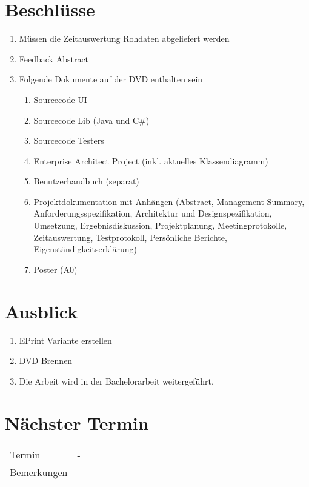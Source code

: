 \documentclass[11pt, a4paper,oneside]{scrartcl}
\begin{document}
	\section{Beschlüsse}
	\begin{enumerate}
		\item Müssen die Zeitauswertung Rohdaten abgeliefert werden
		\item Feedback Abstract
		\item Folgende Dokumente auf der DVD enthalten sein
		\begin{enumerate}
			\item Sourcecode UI
			\item Sourcecode Lib (Java und C\#)
			\item Sourcecode Testers
			\item Enterprise Architect Project (inkl. aktuelles Klassendiagramm)
			\item Benutzerhandbuch (separat)
			\item Projektdokumentation mit Anhängen (Abstract, Management Summary, Anforderungsspezifikation, Architektur und Designspezifikation, Umsetzung, Ergebnisdiskussion, Projektplanung, Meetingprotokolle, Zeitauswertung, Testprotokoll, Persönliche Berichte, Eigenständigkeitserklärung)
			\item Poster (A0)
		\end{enumerate}
	\end{enumerate}
	
	\section{Ausblick}
	\begin{enumerate}
		\item EPrint Variante erstellen
		\item DVD Brennen
		\item Die Arbeit wird in der Bachelorarbeit weitergeführt.
	\end{enumerate}
	
	\section{Nächster Termin}
	\begin{tabu} to \linewidth {l X }
		\toprule
		Termin & -  \\
		Bemerkungen &  \\
		\bottomrule
	\end{tabu}
	
\end{document}
